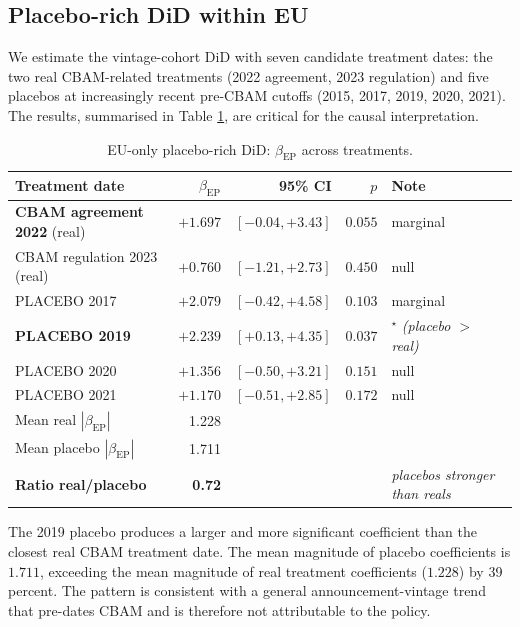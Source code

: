 \documentclass[11pt,a4paper]{article}
\newcommand{\bep}{\beta_{\mathrm{EP}}}
\begin{document}
\subsection{Placebo-rich DiD within EU}

We estimate the vintage-cohort DiD with seven candidate treatment dates: the two real CBAM-related treatments (2022 agreement, 2023 regulation) and five placebos at increasingly recent pre-CBAM cutoffs (2015, 2017, 2019, 2020, 2021). The results, summarised in Table \ref{tab:ch8-eu-placebo}, are critical for the causal interpretation.

\begin{table}[ht]
\centering
\caption{EU-only placebo-rich DiD: $\bep$ across treatments.}
\label{tab:ch8-eu-placebo}
\begin{tabular}{lrrrl}
\toprule
Treatment date & $\bep$ & 95\% CI & $p$ & Note \\
\midrule
\textbf{CBAM agreement 2022} (real) & $+1.697$ & $[-0.04, +3.43]$ & $0.055$ & marginal \\
CBAM regulation 2023 (real)         & $+0.760$ & $[-1.21, +2.73]$ & $0.450$ & null \\
\midrule
PLACEBO 2017 & $+2.079$ & $[-0.42, +4.58]$ & $0.103$ & marginal \\
\textbf{PLACEBO 2019} & $\mathbf{+2.239}$ & $\mathbf{[+0.13, +4.35]}$ & $\mathbf{0.037}$ & $^{\star}$ \emph{(placebo $>$ real)} \\
PLACEBO 2020 & $+1.356$ & $[-0.50, +3.21]$ & $0.151$ & null \\
PLACEBO 2021 & $+1.170$ & $[-0.51, +2.85]$ & $0.172$ & null \\
\midrule
Mean real $|\bep|$    & 1.228 & & & \\
Mean placebo $|\bep|$ & 1.711 & & & \\
\rowcolor{red!10}
\textbf{Ratio real/placebo} & \textbf{0.72} & & & \emph{placebos stronger than reals} \\
\bottomrule
\end{tabular}
\end{table}

The 2019 placebo produces a larger and more significant coefficient than the closest real CBAM treatment date. The mean magnitude of placebo coefficients is $1.711$, exceeding the mean magnitude of real treatment coefficients ($1.228$) by 39 percent. The pattern is consistent with a general announcement-vintage trend that pre-dates CBAM and is therefore not attributable to the policy.

\end{document}
